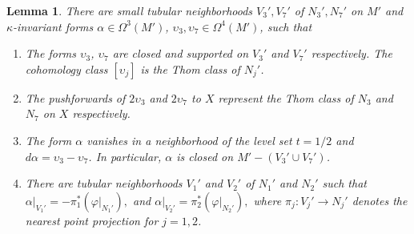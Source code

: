 \documentclass[10pt]{article}
\theoremstyle{plain}
\newtheorem{lem}[proposition]{Lemma}
\theoremstyle{definition}
\theoremstyle{remark}
\begin{document}
\begin{lem} \label{lem:prim-M'}
There are small tubular neighborhoods $V_3',V_7'$ of $N_3',N_7'$ on $M'$ and $\kappa$-invariant forms
 $\alpha \in \Omega^3(M')$, $\upsilon_3, \upsilon_7 \in \Omega^4(M')$, 
such that
\begin{enumerate}
\item The forms $\upsilon_3$, $\upsilon_7$ are closed and supported on $V_3'$ and $V_7'$ respectively. The cohomology class $[\upsilon_j]$ is the Thom class of $N_j'$.
\item The pushforwards of $2\upsilon_3$ and $2\upsilon_7$ to $X$ represent the Thom class of $N_3$ and $N_7$ on $X$ respectively.
\item The form $\alpha$ vanishes in a neighborhood of the level set $t=1/2$ and $d\alpha=\upsilon_3-\upsilon_7$. In particular, $\alpha$ is closed on $M'-(V_3'\cup V_7')$.
\item There are tubular neighborhoods $V_1'$ and $V_2'$ of $N_1'$ and $N_2'$ such that
$
\alpha|_{V_1'}=-\pi_1^*(\varphi|_{N_1'}), 
$
and 
$
\alpha|_{V_2'}=\pi_2^*(\varphi|_{N_2'}), 
$
where $\pi_j \colon V_j' \to N_j'$ denotes the nearest point projection for $j=1,2$.
\end{enumerate}
\end{lem}
\end{document}
